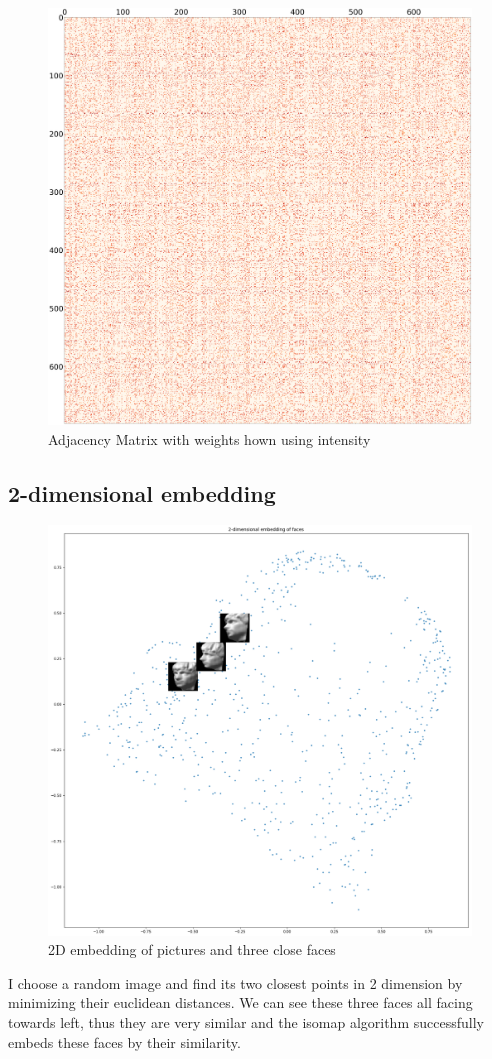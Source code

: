 \documentclass{article}
\begin{document}
\begin{centering}
\begin{figure}[h!]
\centering
  \caption{Adjacency Matrix with weights hown using
intensity}
  \includegraphics[scale = 0.16]{adjacency.png}
\end{figure}
\end{centering}

\subsection{2-dimensional embedding}
\begin{centering}
\begin{figure}[h!]
\centering
  \caption{2D embedding of pictures and three close faces}
  \includegraphics[scale = 0.4]{three_faces.png}
\end{figure}
\end{centering}

I choose a random image and find its two closest points in 2 dimension by minimizing their euclidean distances. We can see these three faces all facing towards left, thus they are very similar and the isomap algorithm successfully embeds these faces by their similarity.
\end{document}
